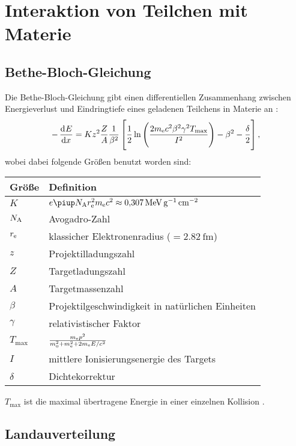 \documentclass[11pt, ngerman, fleqn, DIV=15, headinclude, BCOR=2cm]{scrreprt}
\begin{document}
\section{Interaktion von Teilchen mit Materie}

\subsection{Bethe-Bloch-Gleichung}
\label{sec:bethe-bloch}

Die Bethe-Bloch-Gleichung gibt einen differentiellen Zusammenhang zwischen
Energieverlust und Eindringtiefe eines geladenen Teilchens in Materie an
\parencite[(4.6)]{Grupen/Astroteilchenphysik}:
\[
    - \dod Ex = K z^2 \frac ZA \frac{1}{\beta^2} \sbr{\frac 12
        \ln\del{\frac{2m_\text e c^2 \beta^2 \gamma^2 T_\text{max}}{I^2}} -
    \beta^2 - \frac\delta2},
\]
wobei dabei folgende Größen benutzt worden sind:

\begin{tabular}{ll}
    Größe & Definition \\
    \midrule
    $K$ & $e\piup N_\text A r_\text e^2 m_\text e c^2 \approx
    \SI{0.307}{\mega\electronvolt\per\gram\per\centi\meter\squared}$ \\
    $N_\text A$ & Avogadro-Zahl \\
    $r_\text e$ & klassicher Elektronenradius ($= \SI{2.82}{\femto\meter}$)
    \\
    $z$ & Projektilladungszahl \\
    $Z$ & Targetladungszahl \\
    $A$ & Targetmassenzahl \\
    $\beta$ & Projektilgeschwindigkeit in natürlichen Einheiten \\
    $\gamma$ & relativistischer Faktor \\
    $T_\text{max}$ & $\frac{m_\text e p^2}{m_0^2 + m_\text e^2 + 2 m_\text e E / c^2}$ \\
    $I$ & mittlere Ionisierungsenergie des Targets \\
    $\delta$ & Dichtekorrektur
\end{tabular}

$T_\text{max}$ ist die maximal übertragene Energie in einer einzelnen
Kollision \parencite[24]{Leo/Techniques_Nuclear_Experiments}.

\subsection{Landauverteilung}
\label{sec:landauverteilung}
\end{document}
